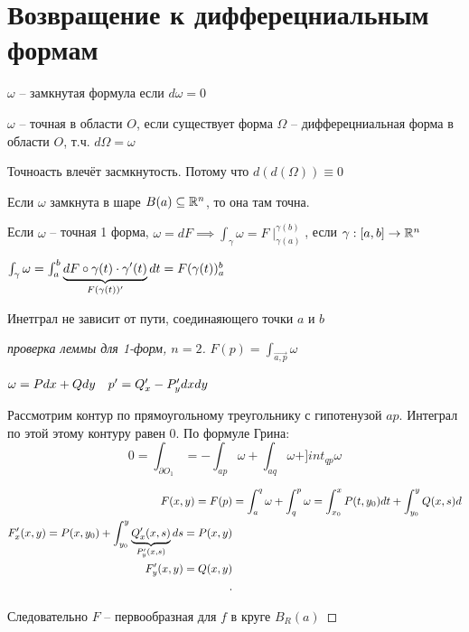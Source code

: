 \section{Возвращение к дифферецниальным формам}

\begin{definition}
    $\omega$ -- замкнутая формула если $d\omega = 0$
\end{definition}

\begin{definition}
    $\omega$ -- точная в области $O$, если существует форма $\Omega$ -- дифферецниальная форма в области $O$, т.ч. $d\Omega = \omega$
\end{definition}

\begin{lemma}
    Точноасть влечёт засмкнутость. Потому что $d(d(\Omega)) \equiv 0$
\end{lemma}

\begin{lemma}
    Если $\omega$ замкнута в шаре $B(a) \subseteq \mathbb{R}^n$, то она там точна.
\end{lemma}

\begin{note}
    Если $\omega$ -- точная 1 форма, $\omega = dF \implies \int_\gamma \omega = F\mid_{\gamma(a)}^{\gamma(b)}$, если $\gamma: [a,b] \to \mathbb{R}^n$

    $\int_\gamma \omega = \int_a^b \underbrace{dF \circ \gamma(t)\cdot \gamma^{\prime}(t)}_{F(\gamma(t))^{\prime}} dt = F(\gamma(t))_a^b$

    Инетграл не зависит от пути, соединаяющего точки $a$ и $b$
\end{note}

\begin{proof}
    [проверка леммы для 1-форм, $n=2$]

    $F(p) = \int_{\vec{a,p}}\omega$

    $\omega = Pdx + Qdy\quad p^{\prime} = Q^{\prime}_x - P^{\prime}_y dxdy$

    Рассмотрим контур по прямоугольному треугольнику с гипотенузой $ap$. Интеграл по этой этому контуру равен 0. По формуле Грина:
    \[ 0 = \int_{\partial O_1} = -\int _{ap}\omega + \int_{aq}\omega + ]int_{qp}\omega\]

    \begin{align*}
        F(x,y) = F(p) &= \int_{a}^q\omega + \int_q^p\omega = \int_{x_0}^{x} P(t,y_0)dt + \int_{y_0}^yQ(x,s)d\\
        F^{\prime}_x(x,y) = P(x,y_0) + \int_{y_0}^y \underbrace{Q^{\prime}_{x}(x,s)}_{P^{\prime}_y(x,s)}ds = P(x,y)\\
        F^{\prime}_y(x,y) = Q(x,y)\\
    .\end{align*}

    Следовательно $F$ -- первообразная для $f$ в круге $B_R(a)$


\end{proof}

